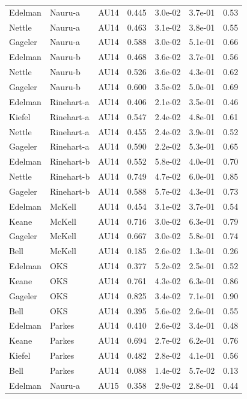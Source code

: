 \documentclass{monashthesis}
\begin{document}
\begin{center}
\begin{longtable}{lllllll}
Edelman & Nauru-a & AU14 & 0.445 & 3.0e-02 & 3.7e-01 & 0.53 \\
Nettle & Nauru-a & AU14 & 0.463 & 3.1e-02 & 3.8e-01 & 0.55 \\
Gageler & Nauru-a & AU14 & 0.588 & 3.0e-02 & 5.1e-01 & 0.66 \\
Edelman & Nauru-b & AU14 & 0.468 & 3.6e-02 & 3.7e-01 & 0.56 \\
Nettle & Nauru-b & AU14 & 0.526 & 3.6e-02 & 4.3e-01 & 0.62 \\
Gageler & Nauru-b & AU14 & 0.600 & 3.5e-02 & 5.0e-01 & 0.69 \\
Edelman & Rinehart-a & AU14 & 0.406 & 2.1e-02 & 3.5e-01 & 0.46 \\
Kiefel & Rinehart-a & AU14 & 0.547 & 2.4e-02 & 4.8e-01 & 0.61 \\
Nettle & Rinehart-a & AU14 & 0.455 & 2.4e-02 & 3.9e-01 & 0.52 \\
Gageler & Rinehart-a & AU14 & 0.590 & 2.2e-02 & 5.3e-01 & 0.65 \\
Edelman & Rinehart-b & AU14 & 0.552 & 5.8e-02 & 4.0e-01 & 0.70 \\
Nettle & Rinehart-b & AU14 & 0.749 & 4.7e-02 & 6.0e-01 & 0.85 \\
Gageler & Rinehart-b & AU14 & 0.588 & 5.7e-02 & 4.3e-01 & 0.73 \\
Edelman & McKell & AU14 & 0.454 & 3.1e-02 & 3.7e-01 & 0.54 \\
Keane & McKell & AU14 & 0.716 & 3.0e-02 & 6.3e-01 & 0.79 \\
Gageler & McKell & AU14 & 0.667 & 3.0e-02 & 5.8e-01 & 0.74 \\
Bell & McKell & AU14 & 0.185 & 2.6e-02 & 1.3e-01 & 0.26 \\
Edelman & OKS & AU14 & 0.377 & 5.2e-02 & 2.5e-01 & 0.52 \\
Keane & OKS & AU14 & 0.761 & 4.3e-02 & 6.3e-01 & 0.86 \\
Gageler & OKS & AU14 & 0.825 & 3.4e-02 & 7.1e-01 & 0.90 \\
Bell & OKS & AU14 & 0.395 & 5.6e-02 & 2.6e-01 & 0.55 \\
Edelman & Parkes & AU14 & 0.410 & 2.6e-02 & 3.4e-01 & 0.48 \\
Keane & Parkes & AU14 & 0.694 & 2.7e-02 & 6.2e-01 & 0.76 \\
Kiefel & Parkes & AU14 & 0.482 & 2.8e-02 & 4.1e-01 & 0.56 \\
Bell & Parkes & AU14 & 0.088 & 1.4e-02 & 5.7e-02 & 0.13 \\
Edelman & Nauru-a & AU15 & 0.358 & 2.9e-02 & 2.8e-01 & 0.44 \\

\end{longtable}
\end{center}
\end{document}
